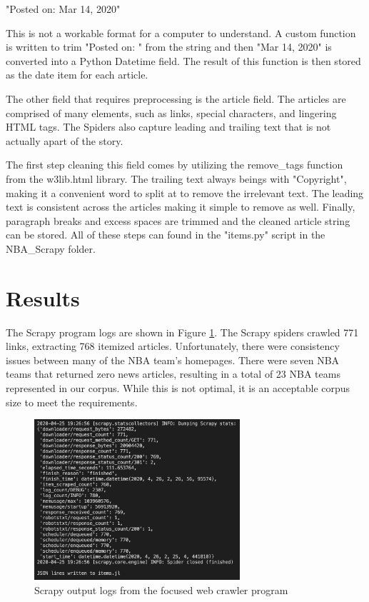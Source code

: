 \documentclass[5p,authoryear]{elsarticle}
\begin{document}
"Posted on: Mar 14, 2020" 

This is not a workable format for a computer to understand. A custom function is written to trim "Posted on: " from the string and then "Mar 14, 2020" is converted into a Python Datetime field. The result of this function is then stored as the date item for each article. 

The other field that requires preprocessing is the article field. The articles are comprised of many elements, such as links, special characters, and lingering HTML tags. The Spiders also capture leading and trailing text that is not actually apart of the story. 

The first step cleaning this field comes by utilizing the remove\_tags function from the w3lib.html library. The trailing text always beings with "Copyright", making it a convenient word to split at to remove the irrelevant text. The leading text is consistent across the articles making it simple to remove as well. Finally, paragraph breaks and excess spaces are trimmed and the cleaned article string can be stored. All of these steps can found in the "items.py" script in the NBA\_Scrapy folder.  



\section{Results}

The Scrapy program logs are shown in Figure \ref{Scrapy Results}. The Scrapy spiders crawled 771 links, extracting 768 itemized articles. Unfortunately, there were consistency issues between many of the NBA team's homepages. There were seven NBA teams that returned zero news articles, resulting in a total of 23 NBA teams represented in our corpus. While this is not optimal, it is an acceptable corpus size to meet the requirements. 

\begin{figure}[!htb] \centering
	\includegraphics[width=3.0in]{figures/Scrapy_Results.png}
	\caption[]{Scrapy output logs from the focused web crawler program} 
	\label{Scrapy Results} 
\end{figure}
\end{document}
